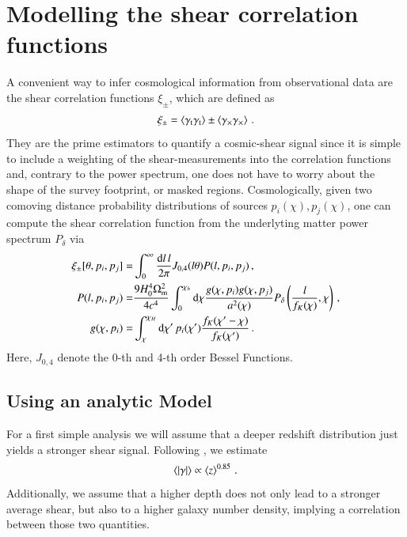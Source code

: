 \section{Modelling the shear correlation functions}
\label{sec:xipm}
A convenient way to infer cosmological information from observational data are the shear correlation functions $\xi_\pm$, which are defined as \[
\xi_\pm = \left< \gamma_{\mathrm t}\gamma_{\mathrm t}\right> \pm \left< \gamma_\times\gamma_\times\right> \, .
\]
They are the prime estimators to quantify a cosmic-shear signal since it is simple to include a weighting of the shear-measurements into the correlation functions and, contrary to the power spectrum, one does not have to worry about the shape of the survey footprint, or masked regions. Cosmologically, given two comoving distance probability distributions of sources $p_i(\chi),p_j(\chi)$, one can compute the shear correlation function from the underlyting matter power spectrum $P_\delta$ via \begin{align}
\label{eq:xipm-pkappa}
\xi_\pm[\theta,p_i,p_j] =& \int_0^\infty \frac{{\rm d}l\,l}{2\pi}J_{0,4}(l\theta)P(l,p_i,p_j)\, , \\
\label{eq:pkappa-pdelta/lenseff}
P(l,p_i,p_j) =& \frac{9 H_0^4\Omega_{\rm m}^2}{4c^4}\int_0^{\chi_h} {\rm d}\chi\frac{g(\chi,p_i)g(\chi,p_j)}{a^2(\chi)}P_\delta\left(\frac{l}{f_K(\chi)},\chi\right)\, , \\
\label{eq:lenseff}
g(\chi,p_i) =& \int_\chi^{\chi_H} {\rm d}\chi'\, p_i(\chi') \frac{f_K(\chi'-\chi)}{f_K(\chi')}\, .
\end{align}
Here, $J_{0,4}$ denote the 0-th and 4-th order Bessel Functions.
\subsection{Using an analytic Model}
For a first simple analysis we will assume that a deeper redshift distribution just yields a stronger shear signal. Following \citet{2006APh....26...91V}, we estimate
\[
\left< |\gamma| \right> \propto \left< z \right> ^{0.85}\, .
\]
Additionally, we assume that a higher depth does not only lead to a stronger average shear, but also to a higher galaxy number density, implying a correlation between those two quantities.


